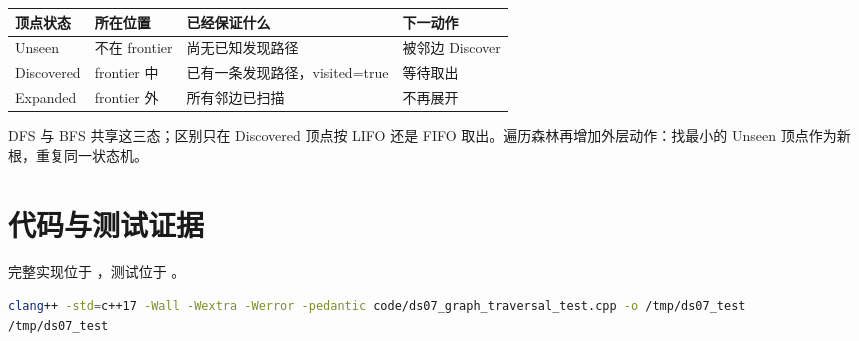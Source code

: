 \documentclass[UTF8,fontset=none,11pt,a4paper]{ctexart}
\begin{document}
\begin{center}\small
\begin{tabularx}{\linewidth}{L{2.1cm}L{2.4cm}YY}
\toprule
顶点状态 & 所在位置 & 已经保证什么 & 下一动作\\
\midrule
Unseen & 不在 frontier & 尚无已知发现路径 & 被邻边 Discover\\
Discovered & frontier 中 & 已有一条发现路径，visited=true & 等待取出\\
Expanded & frontier 外 & 所有邻边已扫描 & 不再展开\\
\bottomrule
\end{tabularx}
\end{center}

DFS 与 BFS 共享这三态；区别只在 Discovered 顶点按 LIFO 还是 FIFO 取出。遍历森林再增加外层动作：找最小的 Unseen 顶点作为新根，重复同一状态机。

\section{代码与测试证据}
完整实现位于 ，测试位于 。


\begin{lstlisting}[language=bash]
clang++ -std=c++17 -Wall -Wextra -Werror -pedantic code/ds07_graph_traversal_test.cpp -o /tmp/ds07_test
/tmp/ds07_test
\end{lstlisting}
\end{document}
